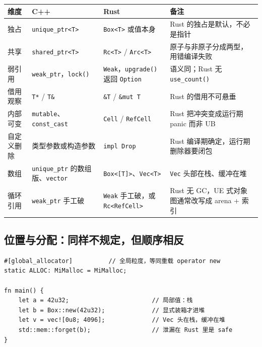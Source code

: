\documentclass[12pt,a4paper,fontset=fandol]{ctexbook}
\begin{document}
\begin{longtable}{@{}>{\raggedright\arraybackslash}p{}>{\raggedright\arraybackslash}p{}>{\raggedright\arraybackslash}p{}>{\raggedright\arraybackslash}p{}@{}}
\toprule
\textbf{维度} & \textbf{C++} & \textbf{Rust} & \textbf{备注} \\
\midrule
独占 & \texttt{unique\_ptr<T>} & \texttt{Box<T>} 或值本身 &
  Rust 的独占是默认，不必是指针 \\
\addlinespace
共享 & \texttt{shared\_ptr<T>} & \texttt{Rc<T>} / \texttt{Arc<T>} &
  原子与非原子分成两型，用错编译失败 \\
\addlinespace
弱引用 & \texttt{weak\_ptr}，\texttt{lock()} &
  \texttt{Weak}，\texttt{upgrade()} 返回 \texttt{Option} &
  语义同；Rust 无 \texttt{use\_count()} \\
\addlinespace
借用观察 & \texttt{T*} / \texttt{T\&} & \texttt{\&T} / \texttt{\&mut T} &
  Rust 的借用不可悬垂 \\
\addlinespace
内部可变 & \texttt{mutable}、\texttt{const\_cast} &
  \texttt{Cell} / \texttt{RefCell} &
  Rust 把冲突变成运行期 panic 而非 UB \\
\addlinespace
自定义删除 & 类型参数或构造参数 & \texttt{impl Drop} &
  Rust 编译期确定，运行期删除器要闭包 \\
\addlinespace
数组 & \texttt{unique\_ptr} 的数组版、\texttt{vector} &
  \texttt{Box<[T]>}、\texttt{Vec<T>} &
  \texttt{Vec} 头部在栈、缓冲在堆 \\
\addlinespace
循环引用 & \texttt{weak\_ptr} 手工破 &
  \texttt{Weak} 手工破，或 \texttt{Rc<RefCell>} &
  Rust 无 GC，UE 式对象图通常改写成 arena + 索引 \\
\bottomrule
\end{longtable}

\subsection{位置与分配：同样不规定，但顺序相反}

\begin{lstlisting}[style=ruststyle,caption={Rust 的分配入口与位置归属}]
#[global_allocator]          // 全局粒度，等同重载 operator new
static ALLOC: MiMalloc = MiMalloc;

fn main() {
    let a = 42u32;                       // 局部值：栈
    let b = Box::new(42u32);             // 显式装箱才进堆
    let v = vec![0u8; 4096];             // Vec 头在栈，缓冲在堆
    std::mem::forget(b);                 // 泄漏在 Rust 里是 safe
}
\end{lstlisting}
\end{document}
